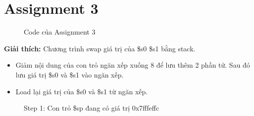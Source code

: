 \documentclass[a4paper,12pt]{article}
\begin{document}
\section{Assignment 3}
\begin{figure}[!h]
	\centerline{}
	\caption{Code của Assignment 3}
	\label{fig:ass3}
\end{figure}
\noindent
\textbf{Giải thích: }Chương trình swap giá trị của \$s0 \$s1 bằng stack.
\begin{itemize}
	\item Giảm nội dung của con trỏ ngăn xếp xuống 8 để lưu thêm 2 phần tử. Sau đó lưu giá trị \$s0 và \$s1 vào ngăn xếp.
	\item Load lại giá trị của \$s0 và \$s1 từ ngăn xếp. 
\end{itemize}
\begin{figure}[!h]
	\centerline{}
	\caption*{Step 1: Con trỏ \$sp đang có giá trị 0x7fffeffc}
	\label{fig:ass3_1}
\end{figure}
\end{document}
